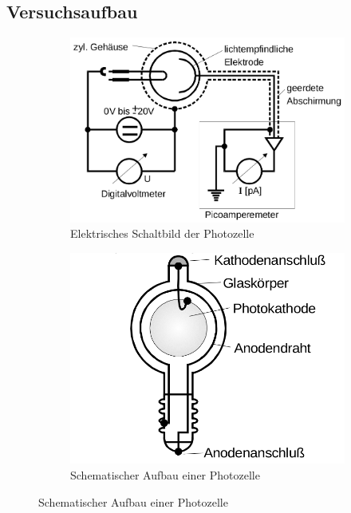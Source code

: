 \subsection{Versuchsaufbau}
\label{sec:Versuchsaufbau}



\begin{figure}
    \centering
    \begin{subfigure}{0.48\textwidth}
        \includegraphics[width=\textwidth]{Bilder/schaltbild.png}
        \caption{Elektrisches Schaltbild der Photozelle \cite{Anleitung}}
        \label{fig:schalte}
    \end{subfigure}
    \begin{subfigure}{0.48\textwidth}
        \includegraphics[width=\textwidth]{Bilder/aufbau_photozelle.png}
        \caption{Schematischer Aufbau einer Photozelle \cite{Anleitung}}
        \label{fig:photozelle}
    \end{subfigure}
\end{figure}
